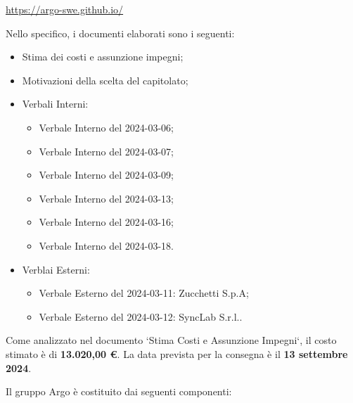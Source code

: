 \quad \href{https://argo-swe.github.io/}{https://argo-swe.github.io/} \newline

Nello specifico, i documenti elaborati sono i seguenti: 
\begin{itemize}
    \item Stima dei costi e assunzione impegni;
    \item Motivazioni della scelta del capitolato; 
    \item Verbali Interni: 
    \begin{itemize}
        \item Verbale Interno del 2024-03-06;
        \item Verbale Interno del 2024-03-07;
        \item Verbale Interno del 2024-03-09;
        \item Verbale Interno del 2024-03-13;
        \item Verbale Interno del 2024-03-16;
        \item Verbale Interno del 2024-03-18.
    \end{itemize}
    \item Verblai Esterni:
    \begin{itemize}
        \item Verbale Esterno del 2024-03-11: Zucchetti S.p.A;
        \item Verbale Esterno del 2024-03-12: SyncLab S.r.l..
    \end{itemize}
\end{itemize}

Come analizzato nel documento ‘Stima Costi e Assunzione Impegni‘, il costo stimato è di \textbf{13.020,00 €}.
La data prevista per la consegna è il \textbf{13 settembre 2024}. \newline

Il gruppo Argo è costituito dai seguenti componenti: 

